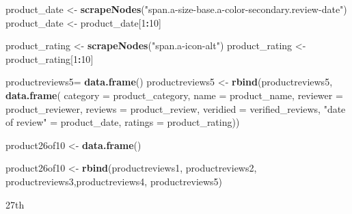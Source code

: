 \documentclass[
]{article}
\newenvironment{Shaded}{\begin{snugshade}}{\end{snugshade}}
\newcommand{\AttributeTok}[1]{\textcolor[rgb]{0.13,0.29,0.53}{#1}}
\newcommand{\DecValTok}[1]{\textcolor[rgb]{0.00,0.00,0.81}{#1}}
\newcommand{\FunctionTok}[1]{\textcolor[rgb]{0.13,0.29,0.53}{\textbf{#1}}}
\newcommand{\NormalTok}[1]{#1}
\newcommand{\OtherTok}[1]{\textcolor[rgb]{0.56,0.35,0.01}{#1}}
\newcommand{\SpecialCharTok}[1]{\textcolor[rgb]{0.81,0.36,0.00}{\textbf{#1}}}
\newcommand{\StringTok}[1]{\textcolor[rgb]{0.31,0.60,0.02}{#1}}
\begin{document}
\begin{Shaded}
\begin{Highlighting}[]
\NormalTok{  product\_date }\OtherTok{\textless{}{-}} \FunctionTok{scrapeNodes}\NormalTok{(}\StringTok{"span.a{-}size{-}base.a{-}color{-}secondary.review{-}date"}\NormalTok{)}
\NormalTok{  product\_date }\OtherTok{\textless{}{-}}\NormalTok{ product\_date[}\DecValTok{1}\SpecialCharTok{:}\DecValTok{10}\NormalTok{]}
  
\NormalTok{  product\_rating }\OtherTok{\textless{}{-}} \FunctionTok{scrapeNodes}\NormalTok{(}\StringTok{"span.a{-}icon{-}alt"}\NormalTok{)}
\NormalTok{  product\_rating }\OtherTok{\textless{}{-}}\NormalTok{ product\_rating[}\DecValTok{1}\SpecialCharTok{:}\DecValTok{10}\NormalTok{]}
  
\NormalTok{  productreviews5}\OtherTok{=} \FunctionTok{data.frame}\NormalTok{()}
\NormalTok{  productreviews5 }\OtherTok{\textless{}{-}} \FunctionTok{rbind}\NormalTok{(productreviews5, }\FunctionTok{data.frame}\NormalTok{(}
                      \AttributeTok{category =}\NormalTok{ product\_category,}
                      \AttributeTok{name =}\NormalTok{ product\_name,}
                      \AttributeTok{reviewer =}\NormalTok{ product\_reviewer,}
                      \AttributeTok{reviews =}\NormalTok{ product\_review,}
                      \AttributeTok{veridied =}\NormalTok{ verified\_reviews,}
                      \StringTok{"date of review"} \OtherTok{=}\NormalTok{ product\_date,}
                      \AttributeTok{ratings =}\NormalTok{ product\_rating))}
  
\NormalTok{  product26of10 }\OtherTok{\textless{}{-}} \FunctionTok{data.frame}\NormalTok{()}
  
\NormalTok{  product26of10 }\OtherTok{\textless{}{-}} \FunctionTok{rbind}\NormalTok{(productreviews1, productreviews2, productreviews3,productreviews4, productreviews5)}
\end{Highlighting}
\end{Shaded}

27th
\end{document}
